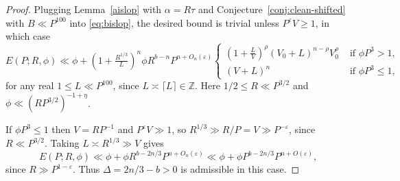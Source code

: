 \documentclass[a4paper,11pt, twoside,reqno]{amsart}
\theoremstyle{plain}
\theoremstyle{definition}
\theoremstyle{remark}
\newcommand{\ZZ}{\mathbb{Z}}
\newcommand{\ve}{\varepsilon}
\renewcommand{\le}{\leqslant}
\renewcommand{\leq}{\leqslant}
\renewcommand{\ge}{\geqslant}
\numberwithin{equation}{section}
\begin{document}
\begin{proof}
Plugging Lemma~\ref{aislop} with $\alpha = R\tau$
and Conjecture~\ref{conj:clean-shifted} with $B \ll P^{100}$
into \eqref{eq:bislop},
the desired bound is trivial unless
$P^\ve V\ge 1$,
in which case
\begin{equation*}
E(P;R,\phi) \ll \phi + (1 + \tfrac{R^{1/3}}{L})^n \phi R^{b-n} P^{n+O_n(\ve)}
\begin{cases}       
(1+\tfrac{L}{V})^\rho (V_0+L)^{n-\rho} V_0^\rho & \text{ if $\phi P^3>1$},\\
(V+L)^n & \text{ if $\phi P^3\leq 1$},
\end{cases}
\end{equation*}
for any real $1\le L\ll P^{100}$,
since $L\asymp \lceil{L}\rceil\in \ZZ$.
Here $1/2\le R\ll P^{3/2}$ and $\phi \ll (RP^{3/2})^{-1+\eta}$.

If $\phi P^3\leq 1$ then $V=RP^{-1}$ and $P^\ve V\gg 1$,
so $R^{1/3} \gg R/P = V \gg P^{-\ve}$, since $R\ll P^{3/2}$.
Taking $L \asymp R^{1/3} \gg V$ gives
\begin{equation*}
E(P;R,\phi) \ll \phi + \phi R^{b - 2n/3} P^{n+O_n(\ve)}
\ll \phi + \phi P^{b - 2n/3} P^{n+O(\ve)},
\end{equation*}
since $R\gg P^{1-\ve}$.
Thus $\Delta = 2n/3 - b > 0$ is admissible in this case.


\end{proof}
\end{document}
